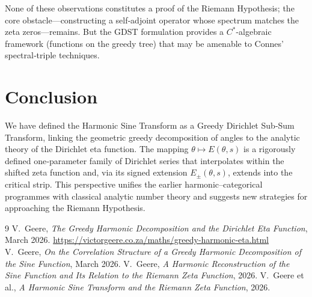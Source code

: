 \documentclass[11pt,a4paper]{article}
\begin{document}
None of these observations constitutes a proof of the Riemann Hypothesis; the core obstacle—constructing a self‑adjoint operator whose spectrum matches the zeta zeros—remains.  But the GDST formulation provides a \(C^*\)-algebraic framework (functions on the greedy tree) that may be amenable to Connes’ spectral‑triple techniques.

\section{Conclusion}
We have defined the Harmonic Sine Transform as a Greedy Dirichlet Sub‑Sum Transform, linking the geometric greedy decomposition of angles to the analytic theory of the Dirichlet eta function.  The mapping \(\theta\mapsto E(\theta,s)\) is a rigorously defined one‑parameter family of Dirichlet series that interpolates within the shifted zeta function and, via its signed extension \(E_\pm(\theta,s)\), extends into the critical strip.  This perspective unifies the earlier harmonic–categorical programmes with classical analytic number theory and suggests new strategies for approaching the Riemann Hypothesis.

\begin{thebibliography}{9}
V.~Geere, \emph{The Greedy Harmonic Decomposition and the Dirichlet Eta Function}, March 2026.
\url{https://victorgeere.co.za/maths/greedy-harmonic-eta.html}
V.~Geere, \emph{On the Correlation Structure of a Greedy Harmonic Decomposition of the Sine Function}, March 2026.
V.~Geere, \emph{A Harmonic Reconstruction of the Sine Function and Its Relation to the Riemann Zeta Function}, 2026.
V.~Geere et al., \emph{A Harmonic Sine Transform and the Riemann Zeta Function}, 2026.
\end{thebibliography}
\end{document}

